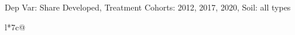 \begin{table}[H]
\captionlistentry[table]{}
\label{table:beaver_land_class_DVis_land_class_3_SCg123_SSall_soil}
\scriptsize %
Dep Var: Share Developed, Treatment Cohorts: 2012, 2017, 2020, Soil: all types \\
\begin{threeparttable}
\begin{tabulary}{\textwidth}{l*{7}{c}@{}}
\toprule \toprule
\noalign{\smallskip}
\noalign{\smallskip}
\midrule \bottomrule
\end{tabulary}
\medskip
\end{threeparttable}
\end{table}
